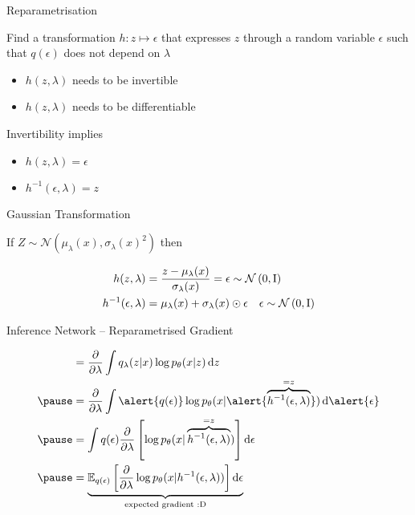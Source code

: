 \begin{frame}{Reparametrisation}

Find a transformation $ h: z \mapsto \epsilon $ that expresses $z$ through a random variable $\epsilon$ such that \alert{ $q(\epsilon)$ does not depend on $ \lambda $} \pause
\begin{itemize}
\item $ h(z, \lambda) $ needs to be invertible \pause
\item $ h(z, \lambda) $ needs to be differentiable
\pause
\end{itemize}
Invertibility implies
\begin{itemize}
\item $ h(z, \lambda) = \epsilon $
\item $ h^{-1}(\epsilon, \lambda) = z $ 
\end{itemize}


\end{frame}

\begin{frame}{Gaussian Transformation}

If $Z \sim \mathcal N(\mu_\lambda(x), \sigma_\lambda(x)^2)$ then

\begin{align*}
h(z, \lambda) &= \frac{z - \mu_\lambda(x)}{ \sigma_\lambda(x) } = \epsilon \sim \mathcal{N}\left(0,\operatorname{I}\right) \\
h^{-1}(\epsilon, \lambda) &= \mu_\lambda(x) + \sigma_\lambda(x) \odot \epsilon~~~\epsilon \sim \mathcal{N}\left(0,\operatorname{I}\right)
\end{align*}


\end{frame}

\begin{frame}[plain]{Inference Network -- Reparametrised Gradient}

\begin{equation*}
\begin{aligned}
&= \pdv{\lambda} \int q_\lambda(z|x)\log p_\theta(x|z) \dd{z} \\ \pause
&= \pdv{\lambda} \int \alert{q(\epsilon)} \log p_\theta(x | \alert{\overbrace{h^{-1}(\epsilon, \lambda)}^{=z}}) \dd{\alert{\epsilon}} \\ \pause
&= \int q(\epsilon) \pdv{\lambda} \left[ \log p_\theta(x| \overbrace{h^{-1}(\epsilon, \lambda)}^{=z})\right] \dd{\epsilon} \\ \pause
&= \underbrace{\mathbb E_{q(\epsilon)}\left[ \pdv{\lambda} \log p_\theta(x| h^{-1}(\epsilon, \lambda))\right] \dd{\epsilon}}_{\text{expected gradient :D}} 
\end{aligned}
\end{equation*}
\end{frame}

